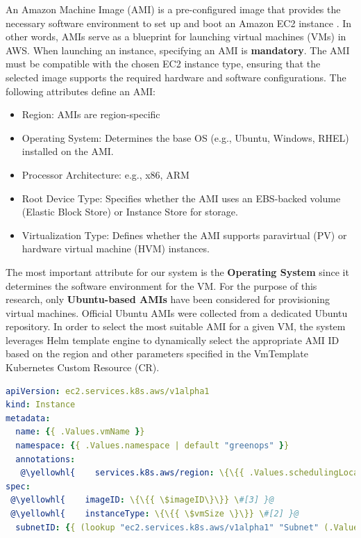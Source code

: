 An Amazon Machine Image (AMI) is a pre-configured image that provides the necessary software environment to set up and boot an Amazon EC2 instance \cite{aws_AMIs}. In other words, AMIs serve as a blueprint for launching virtual machines (VMs) in AWS.
When launching an instance, specifying an AMI is \textbf{mandatory}. The AMI must be compatible with the chosen EC2 instance type, ensuring that the selected image supports the required hardware and software configurations.
The following attributes define an AMI:
\begin{itemize}[itemsep=0.2pt, topsep=1pt] 
  \item[$\bullet$] Region: AMIs are region-specific
  \item[$\bullet$] Operating System: Determines the base OS (e.g., Ubuntu, Windows, RHEL) installed on the AMI.
  \item[$\bullet$] Processor Architecture: e.g., x86, ARM
  \item[$\bullet$] Root Device Type: Specifies whether the AMI uses an EBS-backed volume (Elastic Block Store) or Instance Store for storage.
  \item[$\bullet$] Virtualization Type: Defines whether the AMI supports paravirtual (PV) or hardware virtual machine (HVM) instances.
\end{itemize}

The most important attribute for our system is the \textbf{Operating System} since it determines the software environment for the VM.
For the purpose of this research, only \textbf{Ubuntu-based AMIs} have been considered for provisioning virtual machines. Official Ubuntu AMIs were collected from a dedicated Ubuntu repository.
In order to select the most suitable AMI for a given VM, the system leverages Helm template engine to dynamically select the appropriate AMI ID based on the region and other parameters specified in the VmTemplate Kubernetes Custom Resource (CR).

\begin{lstlisting}[language=yaml, caption={AWS}, label={lst:aws}]
apiVersion: ec2.services.k8s.aws/v1alpha1
kind: Instance
metadata:
  name: {{ .Values.vmName }}
  namespace: {{ .Values.namespace | default "greenops" }}
  annotations:
   @\yellowhl{    services.k8s.aws/region: \{\{{ .Values.schedulingLocation \}\}} \#[1] }@
spec:
 @\yellowhl{    imageID: \{\{{ \$imageID\}\}} \#[3] }@
 @\yellowhl{    instanceType: \{\{{ \$vmSize \}\}} \#[2] }@
  subnetID: {{ (lookup "ec2.services.k8s.aws/v1alpha1" "Subnet" (.Values.namespace | default "greenops") (printf "%s-subnet" .Values.vmName)).status.subnetID }}
\end{lstlisting}













